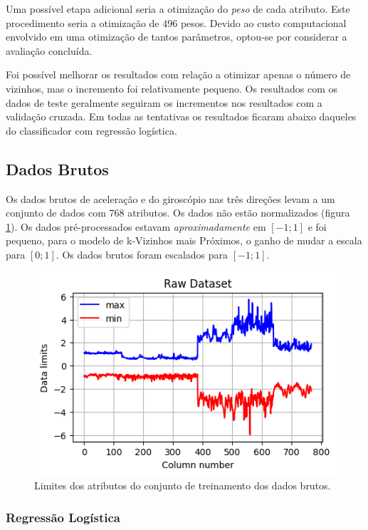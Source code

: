 \documentclass[final,5p]{elsarticle}
\numberwithin{equation}{section}
\begin{document}
        Uma possível etapa adicional seria a otimização do \emph{peso} de cada atributo. Este procedimento seria a otimização de 496 pesos. Devido ao custo computacional envolvido em uma otimização de tantos parâmetros, optou-se por considerar a avaliação concluída.

        Foi possível melhorar os resultados com relação a otimizar apenas o número de vizinhos, mas o incremento foi relativamente pequeno. Os resultados com os dados de teste geralmente seguiram os incrementos nos resultados com a validação cruzada. Em todas as tentativas os resultados ficaram abaixo daqueles do classificador com regressão logística.

    \subsection{Dados Brutos}

        Os dados brutos de aceleração e do giroscópio nas três direções levam a um conjunto de dados com 768 atributos. Os dados não estão normalizados (figura \ref{fig:dados_brutos}). Os dados pré-processados estavam \emph{aproximadamente} em $[-1;1]$ e foi pequeno, para o modelo de k-Vizinhos mais Próximos, o ganho de mudar a escala para $[0;1]$. Os dados brutos foram escalados para $[-1;1]$.

        \begin{figure}[hbt!]
            \includegraphics[width=0.95\columnwidth]{B_Dataset_Scale.png}
            \caption{Limites dos atributos do conjunto de treinamento dos dados brutos.}
            \label{fig:dados_brutos}
        \end{figure}



    \subsubsection{Regressão Logística}
\end{document}
